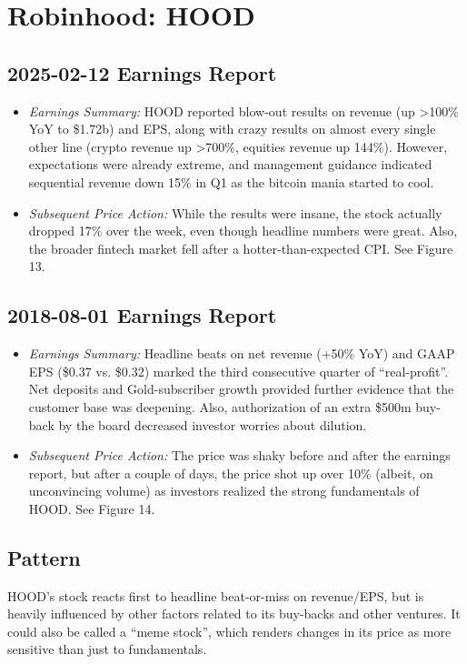 \documentclass[11pt]{article}
\begin{document}
\section{Robinhood: HOOD}
    \subsection{2025-02-12 Earnings Report}
        \begin{itemize}
            \item \textit{Earnings Summary:} HOOD reported blow-out results on revenue (up >100\% YoY to \$1.72b) and EPS, along with crazy results on almost every single other line (crypto revenue up >700\%, equities revenue up 144\%). However, expectations were already extreme, and management guidance indicated sequential revenue down 15\% in Q1 as the bitcoin mania started to cool.
            \item \textit{Subsequent Price Action:} While the results were insane, the stock actually dropped 17\% over the week, even though headline numbers were great. Also, the broader fintech market fell after a hotter-than-expected CPI. See Figure 13.
        \end{itemize}
    \subsection{2018-08-01 Earnings Report}
        \begin{itemize}
            \item \textit{Earnings Summary:} Headline beats on net revenue (+50\% YoY) and GAAP EPS (\$0.37 vs. \$0.32) marked the third consecutive quarter of ``real-profit''. Net deposits and Gold-subscriber growth provided further evidence that the customer base was deepening. Also, authorization of an extra \$500m buy-back by the board decreased investor worries about dilution.
            \item \textit{Subsequent Price Action:} The price was shaky before and after the earnings report, but after a couple of days, the price shot up over 10\% (albeit, on unconvincing volume) as investors realized the strong fundamentals of HOOD. See Figure 14.
        \end{itemize}
    \subsection{Pattern}
        HOOD's stock reacts first to headline beat-or-miss on revenue/EPS, but is heavily influenced by other factors related to its buy-backs and other ventures. It could also be called a ``meme stock'', which renders changes in its price as more sensitive than just to fundamentals.
\end{document}
